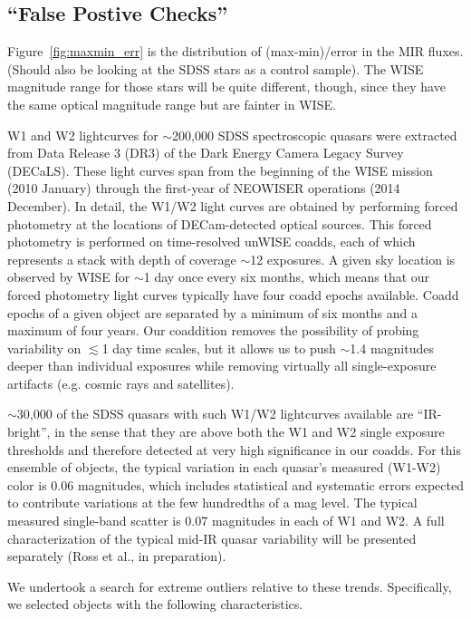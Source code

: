 \documentclass{emulateapj}
\begin{document}
\subsection{``False Postive Checks''}
Figure~\ref{fig:maxmin_err} is the distribution of (max-min)/error in
the MIR fluxes.  (Should also be looking at the SDSS stars as a
control sample).  The WISE magnitude
range for those stars will be quite different, though, since they have
the same optical magnitude range but are fainter in WISE.

W1 and W2 lightcurves for $\sim$200,000 SDSS spectroscopic quasars
were extracted from Data Release 3 (DR3) of the Dark Energy Camera
Legacy Survey (DECaLS). These light curves span from the beginning of
the WISE mission (2010 January) through the first-year of NEOWISER
operations (2014 December). In detail, the W1/W2 light curves are
obtained by performing forced photometry at the locations of
DECam-detected optical sources. This forced photometry is performed on
time-resolved unWISE coadds, each of which represents a stack with
depth of coverage $\sim$12 exposures. A given sky location is observed
by WISE for $\sim$1 day once every six months, which means that our
forced photometry light curves typically have four coadd epochs
available. Coadd epochs of a given object are separated by a minimum
of six months and a maximum of four years. Our coaddition removes the
possibility of probing variability on $\lesssim$1 day time scales, but
it allows us to push $\sim$1.4 magnitudes deeper than individual
exposures while removing virtually all single-exposure artifacts
(e.g. cosmic rays and satellites).

$\sim$30,000 of the SDSS quasars with such W1/W2 lightcurves available
are ``IR-bright'', in the sense that they are above both the W1 and W2
single exposure thresholds and therefore detected at very high
significance in our coadds. For this ensemble of objects, the typical
variation in each quasar's measured (W1-W2) color is 0.06 magnitudes,
which includes statistical and systematic errors expected to
contribute variations at the few hundredths of a mag level. The
typical measured single-band scatter is 0.07 magnitudes in each of W1
and W2. A full characterization of the typical mid-IR quasar
variability will be presented separately (Ross et al., in
preparation).

We undertook a search for extreme outliers relative to these trends.
Specifically, we selected objects with the following characteristics.
\end{document}
